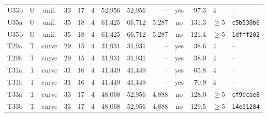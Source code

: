 \begin{tabular}{@{}lccrrrrrrcrll@{}}
U33b & U & unif. & 33 & 17 & 4 & 52{,}956 & 52{,}956 & -- & yes & 97.3 & 4 & -- \\
U35a & U & unif. & 35 & 18 & 4 & 61{,}425 & 66{,}712 & 5{,}287 & no & 131.3 & $\ge5$ & \texttt{c5b530b6} \\
U35b & U & unif. & 35 & 18 & 4 & 61{,}425 & 66{,}712 & 5{,}287 & no & 121.4 & $\ge5$ & \texttt{1dfff202} \\
\addlinespace
T29a & T & curve & 29 & 15 & 4 & 31{,}931 & 31{,}931 & -- & yes & 38.6 & 4 & -- \\
T29b & T & curve & 29 & 15 & 4 & 31{,}931 & 31{,}931 & -- & yes & 38.0 & 4 & -- \\
T31a & T & curve & 31 & 16 & 4 & 41{,}449 & 41{,}449 & -- & yes & 65.8 & 4 & -- \\
T31b & T & curve & 31 & 16 & 4 & 41{,}449 & 41{,}449 & -- & yes & 70.9 & 4 & -- \\
T33a & T & curve & 33 & 17 & 4 & 48{,}068 & 52{,}956 & 4{,}888 & no & 128.0 & $\ge5$ & \texttt{cf9dcae8} \\
T33b & T & curve & 33 & 17 & 4 & 48{,}068 & 52{,}956 & 4{,}888 & no & 129.5 & $\ge5$ & \texttt{14e31284} \\
\bottomrule
\end{tabular}
